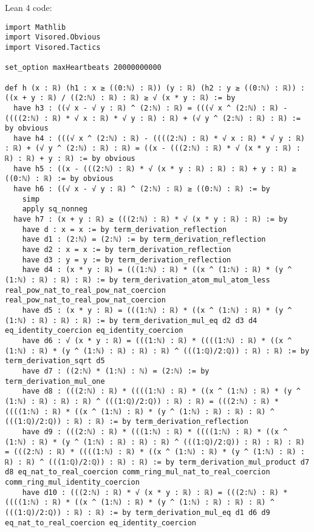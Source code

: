 \documentclass{article}
\begin{document}
Lean 4 code:
\begin{tcolorbox}[colback=white!10, width=\linewidth]
\begin{lstlisting}[language=Lean4]
import Mathlib
import Visored.Obvious
import Visored.Tactics

set_option maxHeartbeats 20000000000

def h (x : ℝ) (h1 : x ≥ ((0:ℕ) : ℝ)) (y : ℝ) (h2 : y ≥ ((0:ℕ) : ℝ)) : ((x + y : ℝ) / ((2:ℕ) : ℝ) : ℝ) ≥ √ (x * y : ℝ) := by
  have h3 : ((√ x - √ y : ℝ) ^ (2:ℕ) : ℝ) = (((√ x ^ (2:ℕ) : ℝ) - ((((2:ℕ) : ℝ) * √ x : ℝ) * √ y : ℝ) : ℝ) + (√ y ^ (2:ℕ) : ℝ) : ℝ) := by obvious
  have h4 : (((√ x ^ (2:ℕ) : ℝ) - ((((2:ℕ) : ℝ) * √ x : ℝ) * √ y : ℝ) : ℝ) + (√ y ^ (2:ℕ) : ℝ) : ℝ) = ((x - (((2:ℕ) : ℝ) * √ (x * y : ℝ) : ℝ) : ℝ) + y : ℝ) := by obvious
  have h5 : ((x - (((2:ℕ) : ℝ) * √ (x * y : ℝ) : ℝ) : ℝ) + y : ℝ) ≥ ((0:ℕ) : ℝ) := by obvious
  have h6 : ((√ x - √ y : ℝ) ^ (2:ℕ) : ℝ) ≥ ((0:ℕ) : ℝ) := by
    simp
    apply sq_nonneg
  have h7 : (x + y : ℝ) ≥ (((2:ℕ) : ℝ) * √ (x * y : ℝ) : ℝ) := by
    have d : x = x := by term_derivation_reflection
    have d1 : (2:ℕ) = (2:ℕ) := by term_derivation_reflection
    have d2 : x = x := by term_derivation_reflection
    have d3 : y = y := by term_derivation_reflection
    have d4 : (x * y : ℝ) = (((1:ℕ) : ℝ) * ((x ^ (1:ℕ) : ℝ) * (y ^ (1:ℕ) : ℝ) : ℝ) : ℝ) := by term_derivation_atom_mul_atom_less real_pow_nat_to_real_pow_nat_coercion real_pow_nat_to_real_pow_nat_coercion
    have d5 : (x * y : ℝ) = (((1:ℕ) : ℝ) * ((x ^ (1:ℕ) : ℝ) * (y ^ (1:ℕ) : ℝ) : ℝ) : ℝ) := by term_derivation_mul_eq d2 d3 d4 eq_identity_coercion eq_identity_coercion
    have d6 : √ (x * y : ℝ) = (((1:ℕ) : ℝ) * ((((1:ℕ) : ℝ) * ((x ^ (1:ℕ) : ℝ) * (y ^ (1:ℕ) : ℝ) : ℝ) : ℝ) ^ (((1:ℚ)/2:ℚ)) : ℝ) : ℝ) := by term_derivation_sqrt d5
    have d7 : ((2:ℕ) * (1:ℕ) : ℕ) = (2:ℕ) := by term_derivation_mul_one
    have d8 : (((2:ℕ) : ℝ) * ((((1:ℕ) : ℝ) * ((x ^ (1:ℕ) : ℝ) * (y ^ (1:ℕ) : ℝ) : ℝ) : ℝ) ^ (((1:ℚ)/2:ℚ)) : ℝ) : ℝ) = (((2:ℕ) : ℝ) * ((((1:ℕ) : ℝ) * ((x ^ (1:ℕ) : ℝ) * (y ^ (1:ℕ) : ℝ) : ℝ) : ℝ) ^ (((1:ℚ)/2:ℚ)) : ℝ) : ℝ) := by term_derivation_reflection
    have d9 : (((2:ℕ) : ℝ) * (((1:ℕ) : ℝ) * ((((1:ℕ) : ℝ) * ((x ^ (1:ℕ) : ℝ) * (y ^ (1:ℕ) : ℝ) : ℝ) : ℝ) ^ (((1:ℚ)/2:ℚ)) : ℝ) : ℝ) : ℝ) = (((2:ℕ) : ℝ) * ((((1:ℕ) : ℝ) * ((x ^ (1:ℕ) : ℝ) * (y ^ (1:ℕ) : ℝ) : ℝ) : ℝ) ^ (((1:ℚ)/2:ℚ)) : ℝ) : ℝ) := by term_derivation_mul_product d7 d8 eq_nat_to_real_coercion comm_ring_mul_nat_to_real_coercion comm_ring_mul_identity_coercion
    have d10 : (((2:ℕ) : ℝ) * √ (x * y : ℝ) : ℝ) = (((2:ℕ) : ℝ) * ((((1:ℕ) : ℝ) * ((x ^ (1:ℕ) : ℝ) * (y ^ (1:ℕ) : ℝ) : ℝ) : ℝ) ^ (((1:ℚ)/2:ℚ)) : ℝ) : ℝ) := by term_derivation_mul_eq d1 d6 d9 eq_nat_to_real_coercion eq_identity_coercion

\end{lstlisting}
\end{tcolorbox}
\end{document}
